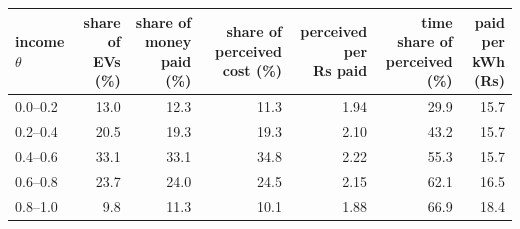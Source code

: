 \begin{tabular}{@{}lrrrrrr@{}}
\toprule
income $\theta$ & \shortstack[r]{share of\\EVs (\%)} & \shortstack[r]{share of\\money paid (\%)} & \shortstack[r]{share of\\perceived cost (\%)} & \shortstack[r]{perceived per\\Rs paid} & \shortstack[r]{time share of\\perceived (\%)} & \shortstack[r]{paid per\\kWh (Rs)} \\
\midrule
0.0--0.2 & 13.0 & 12.3 & 11.3 & 1.94 & 29.9 & 15.7 \\
0.2--0.4 & 20.5 & 19.3 & 19.3 & 2.10 & 43.2 & 15.7 \\
0.4--0.6 & 33.1 & 33.1 & 34.8 & 2.22 & 55.3 & 15.7 \\
0.6--0.8 & 23.7 & 24.0 & 24.5 & 2.15 & 62.1 & 16.5 \\
0.8--1.0 & 9.8 & 11.3 & 10.1 & 1.88 & 66.9 & 18.4 \\
\bottomrule
\end{tabular}
